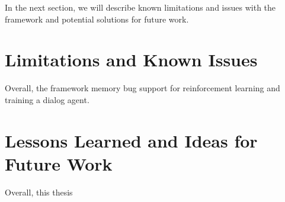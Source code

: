 In the next section, we will describe known limitations and issues with the framework and potential solutions for future work. 

\section{Limitations and Known Issues}
\label{sec:issues} 

Overall, the framework 
memory bug
support for reinforcement learning and training a dialog agent. 


\section{Lessons Learned and Ideas for Future Work}
\label{sec:lessons}
Overall, this thesis 



